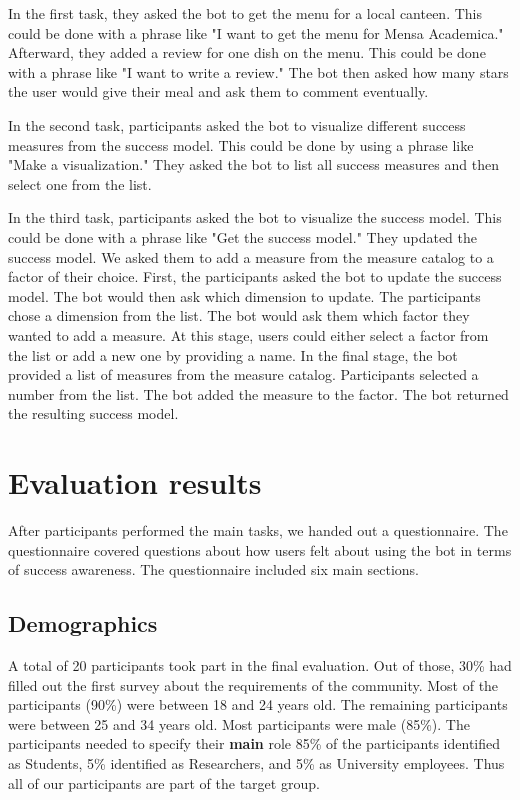 In the first task, they asked the bot to get the menu for a local canteen. This could be done with a phrase like "I want to get the menu for Mensa Academica."
Afterward, they added a review for one dish on the menu. This could be done with a phrase like "I want to write a review." The bot then asked how many stars the user would give their meal and ask them to comment eventually.  

In the second task, participants asked the bot to visualize different success measures from the success model. This could be done by using a phrase like "Make a visualization." They asked the bot to list all success measures and then select one from the list.

In the third task, participants asked the bot to visualize the success model. This could be done with a phrase like "Get the success model." They updated the success model. We asked them to add a measure from the measure catalog to a factor of their choice. 
First, the participants asked the bot to update the success model. The bot would then ask which dimension to update. 
The participants chose a dimension from the list. 
The bot would ask them which factor they wanted to add a measure. 
At this stage, users could either select a factor from the list or add a new one by providing a name. 
In the final stage, the bot provided a list of measures from the measure catalog.
Participants selected a number from the list. 
The bot added the measure to the factor.
The bot returned the resulting success model.

\section{Evaluation results}

After participants performed the main tasks, we handed out a questionnaire.
The questionnaire covered questions about how users felt about using the bot in terms of success awareness. The questionnaire included six main sections. 

\subsection{Demographics}
A total of 20 participants took part in the final evaluation. Out of those, 30\% had filled out the first survey about the requirements of the community. 
Most of the participants (90\%) were between 18 and 24 years old. The remaining participants were between 25 and 34 years old. Most participants were male (85\%).
The participants needed to specify their \textbf{main} role 85\% of the participants identified as Students, 5\% identified as Researchers, and 5\% as University employees. Thus all of our participants are part of the target group.

